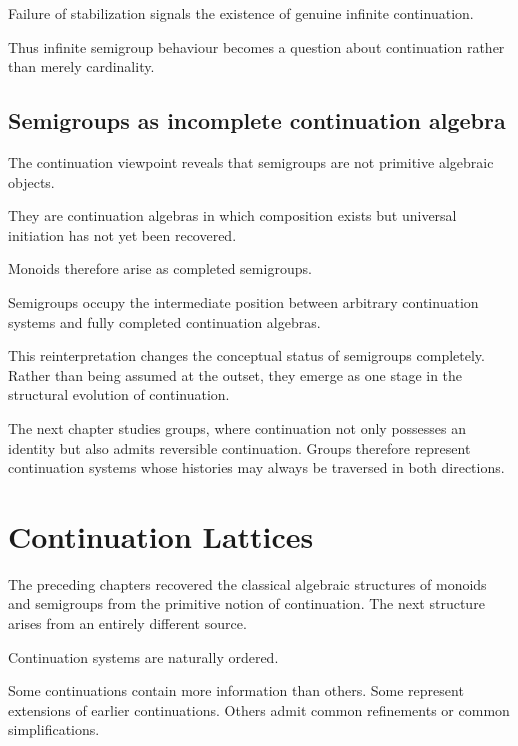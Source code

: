 \documentclass[13pt,openany]{book}
\theoremstyle{plain}
\theoremstyle{definition}
\begin{document}
Failure of stabilization signals the existence of genuine infinite continuation.

Thus infinite semigroup behaviour becomes a question about continuation rather
than merely cardinality.

\section{Semigroups as incomplete continuation algebra}

The continuation viewpoint reveals that semigroups are not primitive algebraic
objects.

They are continuation algebras in which composition exists but universal
initiation has not yet been recovered.

Monoids therefore arise as completed semigroups.

Semigroups occupy the intermediate position between arbitrary continuation
systems and fully completed continuation algebras.

This reinterpretation changes the conceptual status of semigroups completely.
Rather than being assumed at the outset, they emerge as one stage in the
structural evolution of continuation.

The next chapter studies groups, where continuation not only possesses an
identity but also admits reversible continuation. Groups therefore represent
continuation systems whose histories may always be traversed in both directions.

\chapter{Continuation Lattices}

The preceding chapters recovered the classical algebraic structures of monoids
and semigroups from the primitive notion of continuation. The next structure
arises from an entirely different source.

Continuation systems are naturally ordered.

Some continuations contain more information than others. Some represent
extensions of earlier continuations. Others admit common refinements or common
simplifications.
\end{document}
